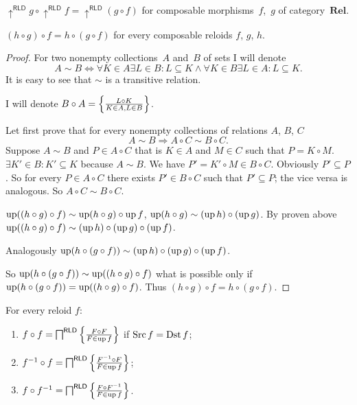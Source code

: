 \begin{obvious}
$\uparrow^{\mathsf{RLD}}g\circ\uparrow^{\mathsf{RLD}}f=\uparrow^{\mathsf{RLD}}(g\circ f)$
for composable morphisms~$f$,~$g$ of category~$\mathbf{Rel}$.\end{obvious}
\begin{thm}
$(h\circ g)\circ f=h\circ(g\circ f)$ for every composable reloids
$f$, $g$, $h$.\end{thm}
\begin{proof}
For two nonempty collections~$A$ and~$B$ of sets I will denote
\[
A\sim B\Leftrightarrow\forall K\in A\exists L\in B:L\subseteq K\wedge\forall K\in B\exists L\in A:L\subseteq K.
\]
It is easy to see that $\sim$ is a transitive relation.

I will denote $B\circ A=\left\{ \frac{L\circ K}{K\in A,L\in B}\right\}$.

Let first prove that for every nonempty collections of relations $A$,
$B$, $C$
\[
A\sim B\Rightarrow A\circ C\sim B\circ C.
\]
Suppose $A\sim B$ and $P\in A\circ C$ that is $K\in A$ and $M\in C$
such that $P=K\circ M$. $\exists K'\in B:K'\subseteq K$ because
$A\sim B$. We have $P'=K'\circ M\in B\circ C$. Obviously $P'\subseteq P$.
So for every $P\in A\circ C$ there exists $P'\in B\circ C$ such
that $P'\subseteq P$; the vice versa is analogous. So $A\circ C\sim B\circ C$.

$\operatorname{up}((h\circ g)\circ f)\sim\operatorname{up}(h\circ g)\circ\operatorname{up} f$, $\operatorname{up}(h\circ g)\sim(\operatorname{up} h)\circ(\operatorname{up} g)$.
By proven above $\operatorname{up}((h\circ g)\circ f)\sim(\operatorname{up} h)\circ(\operatorname{up} g)\circ(\operatorname{up} f)$.

Analogously $\operatorname{up}(h\circ(g\circ f))\sim(\operatorname{up} h)\circ(\operatorname{up} g)\circ(\operatorname{up} f)$.

So $\operatorname{up}(h\circ(g\circ f))\sim\operatorname{up}((h\circ g)\circ f)$ what is possible
only if $\operatorname{up}(h\circ(g\circ f))=\operatorname{up}((h\circ g)\circ f)$. Thus $(h\circ g)\circ f=h\circ(g\circ f)$.\end{proof}
\begin{thm}
\label{rld-prod-ff}For every reloid $f$:
\begin{enumerate}
\item \label{rld-ff}$f\circ f=\bigsqcap^{\mathsf{RLD}}\left\{ \frac{F\circ F}{F\in\operatorname{up} f}\right\}$
if $\operatorname{Src} f=\operatorname{Dst} f$;
\item \label{rld-f1f}$f^{-1}\circ f=\bigsqcap^{\mathsf{RLD}}\left\{ \frac{F^{-1}\circ F}{F\in\operatorname{up} f}\right\}$;
\item \label{rld-ff1}$f\circ f^{-1}=\bigsqcap^{\mathsf{RLD}}\left\{ \frac{F\circ F^{-1}}{F\in\operatorname{up} f}\right\}$.
\end{enumerate}
\end{thm}
